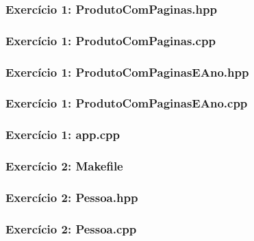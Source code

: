\documentclass[aspectratio=169]{beamer}
\begin{document}
\begin{frame}[fragile]\frametitle{Exercício 1: ProdutoComPaginas.hpp}

\end{frame}

\begin{frame}[fragile]\frametitle{Exercício 1: ProdutoComPaginas.cpp}

\end{frame}

\begin{frame}[fragile]\frametitle{Exercício 1: ProdutoComPaginasEAno.hpp}

\end{frame}

\begin{frame}[fragile]\frametitle{Exercício 1: ProdutoComPaginasEAno.cpp}
\fontsize{3pt}{5pt}\selectfont{

}
\end{frame}

\begin{frame}[fragile]\frametitle{Exercício 1: app.cpp}
\fontsize{3pt}{5pt}\selectfont{

}
\end{frame}

\begin{frame}[fragile]\frametitle{Exercício 2: Makefile}

\end{frame}

\begin{frame}[fragile]\frametitle{Exercício 2: Pessoa.hpp}

\end{frame}

\begin{frame}[fragile]\frametitle{Exercício 2: Pessoa.cpp}
\fontsize{3pt}{5pt}\selectfont{

}
\end{frame}
\end{document}
